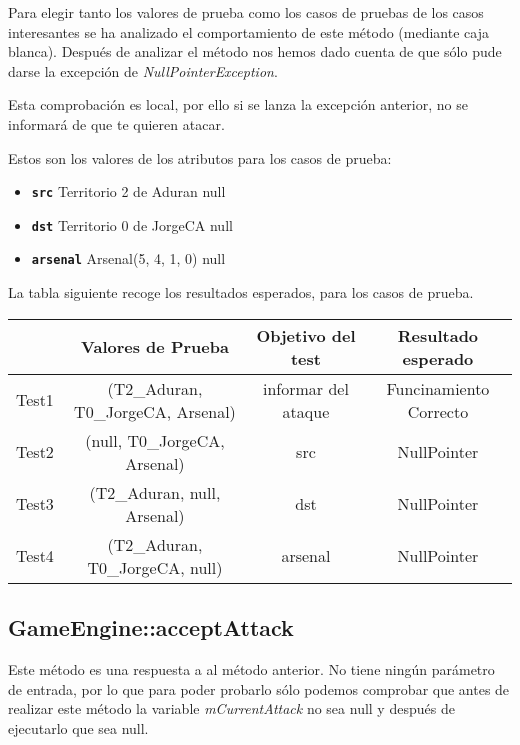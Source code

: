 Para elegir tanto los valores de prueba como los casos de pruebas de los casos interesantes se ha analizado el comportamiento de este método (mediante caja blanca). Después de analizar el método nos hemos dado cuenta de que sólo pude darse la excepción de \textit{NullPointerException}.

Esta comprobación es local, por ello si se lanza la excepción anterior, no se informará de que te quieren atacar.

Estos son los valores de los atributos para los casos de prueba:
\begin{itemize}
\item \textbf{\texttt{src}}
\subitem Territorio 2 de Aduran
\subitem null

\item \textbf{\texttt{dst}}
\subitem Territorio 0 de JorgeCA
\subitem null

\item \textbf{\texttt{arsenal}}
\subitem Arsenal(5, 4, 1, 0)
\subitem null
\end{itemize}

La tabla siguiente recoge los resultados esperados, para los casos de prueba.

{\footnotesize
\begin{longtable}[c]{lccc}
 & \textbf{Valores de Prueba} & \textbf{Objetivo del test} & \textbf{Resultado esperado} \\
\hline \hline
\endhead

Test1 & (T2\_Aduran, T0\_JorgeCA, Arsenal) & informar del ataque & Funcinamiento Correcto\\
Test2 & (null, T0\_JorgeCA, Arsenal) & src & NullPointer\\
Test3 & (T2\_Aduran, null, Arsenal) & dst & NullPointer\\
Test4 & (T2\_Aduran, T0\_JorgeCA, null) & arsenal & NullPointer\\

\hline
\end{longtable}
}

\subsection{GameEngine::acceptAttack}

Este método es una respuesta a al método anterior. No tiene ningún parámetro de entrada, por lo que para poder probarlo sólo podemos comprobar que antes de realizar este método la variable \textit{mCurrentAttack} no sea null y después de ejecutarlo que sea null.

